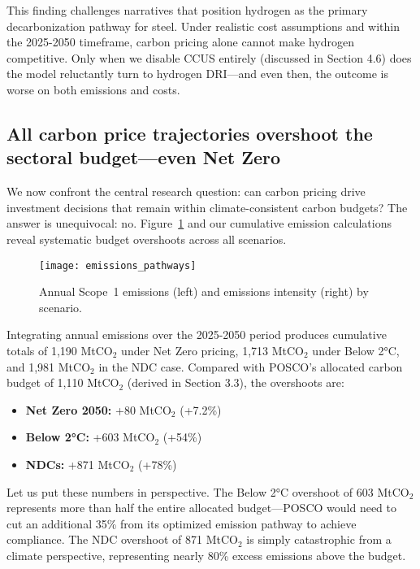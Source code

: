 This finding challenges narratives that position hydrogen as the primary decarbonization pathway for steel. Under realistic cost assumptions and within the 2025-2050 timeframe, carbon pricing alone cannot make hydrogen competitive. Only when we disable CCUS entirely (discussed in Section 4.6) does the model reluctantly turn to hydrogen DRI—and even then, the outcome is worse on both emissions and costs.

\subsection{All carbon price trajectories overshoot the sectoral budget—even Net Zero}

We now confront the central research question: can carbon pricing drive investment decisions that remain within climate-consistent carbon budgets? The answer is unequivocal: no. Figure~\ref{fig:emissions-pathways} and our cumulative emission calculations reveal systematic budget overshoots across all scenarios.

\begin{figure}[!t]
  \centering
  \texttt{[image: emissions\_pathways]}
  \caption{Annual Scope~1 emissions (left) and emissions intensity (right) by scenario.}
  \label{fig:emissions-pathways}
\end{figure}

Integrating annual emissions over the 2025-2050 period produces cumulative totals of 1,190 MtCO$_2$ under Net Zero pricing, 1,713 MtCO$_2$ under Below 2°C, and 1,981 MtCO$_2$ in the NDC case. Compared with POSCO's allocated carbon budget of 1,110 MtCO$_2$ (derived in Section 3.3), the overshoots are:

\begin{itemize}[leftmargin=*]
  \item \textbf{Net Zero 2050:} +80 MtCO$_2$ (+7.2\%)
  \item \textbf{Below 2°C:} +603 MtCO$_2$ (+54\%)
  \item \textbf{NDCs:} +871 MtCO$_2$ (+78\%)
\end{itemize}

Let us put these numbers in perspective. The Below 2°C overshoot of 603 MtCO$_2$ represents more than half the entire allocated budget—POSCO would need to cut an additional 35\% from its optimized emission pathway to achieve compliance. The NDC overshoot of 871 MtCO$_2$ is simply catastrophic from a climate perspective, representing nearly 80\% excess emissions above the budget.

